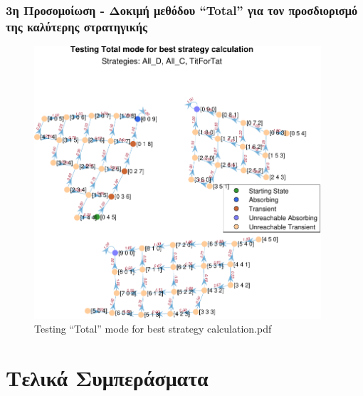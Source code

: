 \documentclass[12pt]{article}
\begin{document}
\subsubsection{3η Προσομοίωση - Δοκιμή  μεθόδου ``Total'' για τον προσδιορισμό της καλύτερης στρατηγικής}
	\begin{figure}[H]
	      \centering
	      \includegraphics[width=0.95\textwidth]{Testing Total mode for best strategy calculation}
	      \caption{Testing ``Total'' mode for best strategy calculation.pdf}
	\end{figure}

\clearpage
\section{Τελικά Συμπεράσματα}

\newpage
\listoffigures{}
\end{document}
